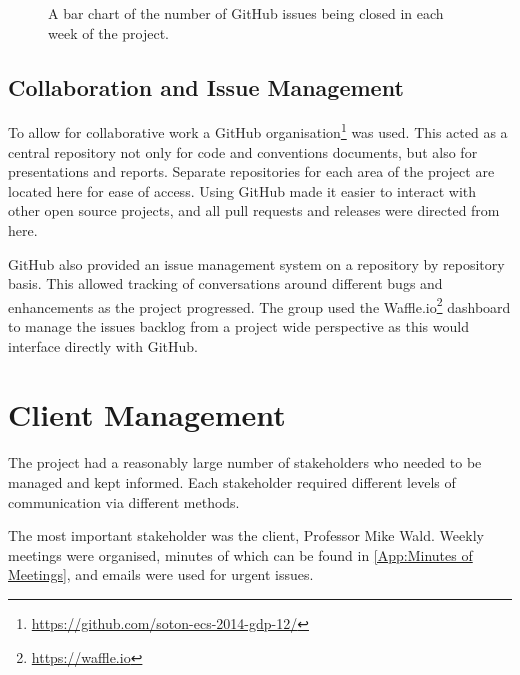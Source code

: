 \begin{figure}
\centering
{}
  \caption{A bar chart of the number of GitHub issues being closed in each week of the project.}
  \label{fig:tasksweek}
\end{figure}


\subsection{Collaboration and Issue Management}
To allow for collaborative work a GitHub organisation\footnote{\url{https://github.com/soton-ecs-2014-gdp-12/}} was used. This acted as a central repository not only for code and conventions documents, but also for presentations and reports. Separate repositories for each area of the project are located here for ease of access. Using GitHub made it easier to interact with other open source projects, and all pull requests and releases were directed from here.

GitHub also provided an issue management system on a repository by repository basis. This allowed tracking of conversations around different bugs and enhancements as the project progressed. The group used the Waffle.io\footnote{\url{https://waffle.io}} dashboard to manage the issues backlog from a project wide perspective as this would interface directly with GitHub.


\section{Client Management}
\label{Section:Client Management}

The project had a reasonably large number of stakeholders who needed to be managed and kept informed. Each stakeholder required different levels of communication via different methods.

The most important stakeholder was the client, Professor Mike Wald. Weekly meetings were organised, minutes of which can be found in \cref{App:Minutes of Meetings}, and emails were used for urgent issues.

